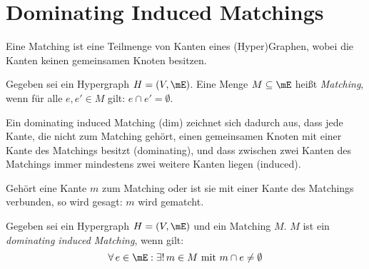 \chapter{Dominating Induced Matchings}

Eine Matching ist eine Teilmenge von Kanten eines (Hyper)Graphen, wobei die Kanten keinen gemeinsamen Knoten besitzen.

\begin{mydef}
Gegeben sei ein Hypergraph $H=(V,\mE)$. Eine Menge $M \subseteq \mE$ heißt \emph{Matching}, wenn für alle $e,e' \in M$ gilt: $e\cap e' = \emptyset$.
\end{mydef}

Ein dominating induced Matching (dim) zeichnet sich dadurch aus, dass jede Kante, die nicht zum Matching gehört, einen gemeinsamen Knoten mit einer Kante des Matchings besitzt (dominating), und dass zwischen zwei Kanten des Matchings immer mindestens zwei weitere Kanten liegen (induced).

Gehört eine Kante $m$ zum Matching oder ist sie mit einer Kante des Matchings verbunden, so wird gesagt: $m$ wird gematcht.

\begin{mydef}
Gegeben sei ein Hypergraph $H=(V,\mE)$ und ein Matching $M$. $M$ ist ein \emph{dominating induced Matching}, wenn gilt:
\[ \forall\,e \in \mE : \exists!\, m \in M \text{ mit } m\cap e \neq \emptyset \]
\end{mydef}



